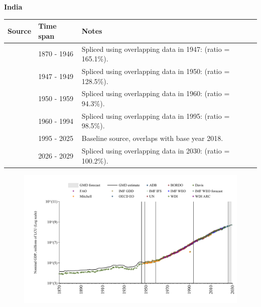 \documentclass[12pt,a4paper,landscape]{article}
\begin{document}
\begin{adjustbox}{max totalsize={\paperwidth}{\paperheight},center}
\begin{minipage}[t][\textheight][t]{\textwidth}
\vspace*{0.5cm}
{}
\begin{center}
{\Large\bfseries India}
\end{center}
\vspace{0.5cm}
\begin{table}[H]
\centering
\small
\begin{tabular}{|l|l|l|}
\hline
\textbf{Source} & \textbf{Time span} & \textbf{Notes} \\
\hline
\rowcolor{white}\cite{Davis}& 1870 - 1946 &Spliced using overlapping data in 1947: (ratio = 165.1\%).\\
\rowcolor{lightgray}\cite{Mitchell}& 1947 - 1949 &Spliced using overlapping data in 1950: (ratio = 128.5\%).\\
\rowcolor{white}\cite{IMF_GDD}& 1950 - 1959 &Spliced using overlapping data in 1960: (ratio = 94.3\%).\\
\rowcolor{lightgray}\cite{WDI}& 1960 - 1994 &Spliced using overlapping data in 1995: (ratio = 98.5\%).\\
\rowcolor{white}\cite{OECD_EO}& 1995 - 2025 &Baseline source, overlaps with base year 2018.\\
\rowcolor{lightgray}\cite{IMF_WEO_forecast}& 2026 - 2029 &Spliced using overlapping data in 2030: (ratio = 100.2\%).\\
\hline
\end{tabular}
\end{table}
\begin{figure}[H]
\centering
\includegraphics[width=\textwidth,height=0.6\textheight,keepaspectratio]{graphs/IND_nGDP.pdf}
\end{figure}
\end{minipage}
\end{adjustbox}
\end{document}
